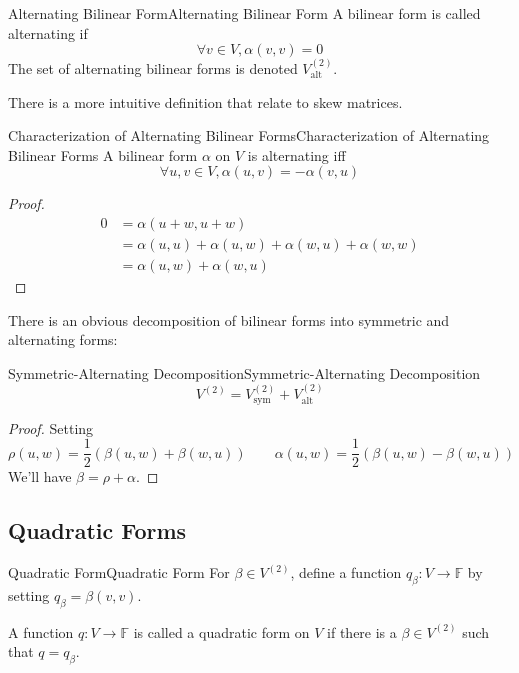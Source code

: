 \documentclass[../main.tex]{subfiles}
\begin{document}
\begin{definition}{Alternating Bilinear Form}{Alternating Bilinear Form}
A bilinear form is called alternating if
\begin{equation*}
\forall v\in V,\alpha(v,v)=0
\end{equation*}
The set of alternating bilinear forms is denoted $V_{\text{alt}}^{(2)}$.
\end{definition}

There is a more intuitive definition that relate to skew matrices.
\begin{theorem}{Characterization of Alternating Bilinear Forms}{Characterization of Alternating Bilinear Forms}
A bilinear form $\alpha$ on $V$ is alternating iff
\begin{equation*}
\forall u,v\in V, \alpha(u,v) = -\alpha(v,u)
\end{equation*}
\end{theorem}
\begin{proof}
\begin{equation*}
\begin{aligned}
	0&=\alpha(u+w,u+w)\\
	 &=\alpha(u,u) + \alpha(u,w)+\alpha(w,u)+\alpha(w,w)\\
	 &=\alpha(u,w)+\alpha(w,u)
\end{aligned}
\end{equation*}
\end{proof}

There is an obvious decomposition of bilinear forms into symmetric and alternating forms:
\begin{theorem}{Symmetric-Alternating Decomposition}{Symmetric-Alternating Decomposition}
\begin{equation}
V^{(2)} = V_{\text{sym}}^{(2)} + V_{\text{alt}}^{(2)}
\end{equation}
\end{theorem}
\begin{proof}
Setting
\begin{equation*}
\rho(u,w) = \frac{1}{2}\left(\beta(u,w) + \beta(w,u)\right) \qquad \alpha(u,w) = \frac{1}{2} \left(\beta(u,w) - \beta(w,u)\right)
\end{equation*}
We'll have $\beta=\rho+\alpha$.
\end{proof}

\subsection{Quadratic Forms}
\begin{definition}{Quadratic Form}{Quadratic Form}
For $\beta\in V^{(2)}$, define a function $q_{\beta}:V \rightarrow \mathbb{F}$ by setting $q_{\beta} = \beta(v,v)$.

A function $q: V \rightarrow \mathbb{F}$ is called a quadratic form on $V$ if there is a $\beta\in V^{(2)}$ such that $q=q_{\beta}$.
\end{definition}
\end{document}
